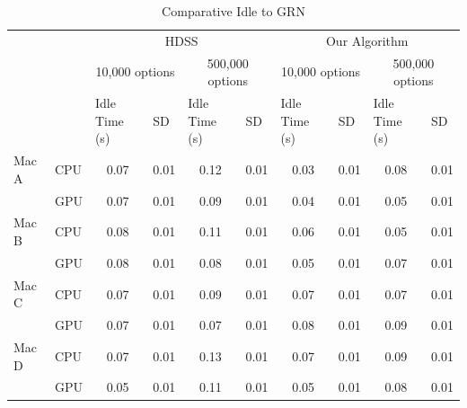 \documentclass[journal]{IEEEtran}
\begin{document}
\begin{table}[htb]
\centering
\caption{Comparative Idle to GRN}
\begin{scriptsize}
\begin{tabular}{|l|l|l|l|l|l|l|l|l|l|}
\cline{3-10}
\multicolumn{1}{l}{} &  & \multicolumn{4}{c|}{HDSS} & \multicolumn{4}{c|}{Our Algorithm} \\ 
\cline{3-10}
\multicolumn{1}{l}{} &  & \multicolumn{2}{c|}{10,000 options} & \multicolumn{2}{c|}{500,000 options} & \multicolumn{2}{c|}{10,000 options} & \multicolumn{2}{c|}{500,000 options} \\ 
\cline{3-10}
\multicolumn{1}{l}{} &  & Idle Time (s) & SD & Idle Time (s) & SD & Idle Time (s) & SD & Idle Time (s) & SD \\ 
\hline
Mac A & CPU & \multicolumn{1}{c|}{0.07} & \multicolumn{1}{c|}{0.01} & \multicolumn{1}{c|}{0.12} & \multicolumn{1}{c|}{0.01} & \multicolumn{1}{c|}{0.03} & \multicolumn{1}{c|}{0.01} & \multicolumn{1}{c|}{0.08} & \multicolumn{1}{c|}{0.01} \\ 
\cline{2-10}
 & GPU & \multicolumn{1}{c|}{0.07} & \multicolumn{1}{c|}{0.01} & \multicolumn{1}{c|}{0.09} & \multicolumn{1}{c|}{0.01} & \multicolumn{1}{c|}{0.04} & \multicolumn{1}{c|}{0.01} & \multicolumn{1}{c|}{0.05} & \multicolumn{1}{c|}{0.01} \\ 
\hline
Mac B & CPU & \multicolumn{1}{c|}{0.08} & \multicolumn{1}{c|}{0.01} & \multicolumn{1}{c|}{0.11} & \multicolumn{1}{c|}{0.01} & \multicolumn{1}{c|}{0.06} & \multicolumn{1}{c|}{0.01} & \multicolumn{1}{c|}{0.05} & \multicolumn{1}{c|}{0.01} \\ 
\cline{2-10}
 & GPU & \multicolumn{1}{c|}{0.08} & \multicolumn{1}{c|}{0.01} & \multicolumn{1}{c|}{0.08} & \multicolumn{1}{c|}{0.01} & \multicolumn{1}{c|}{0.05} & \multicolumn{1}{c|}{0.01} & \multicolumn{1}{c|}{0.07} & \multicolumn{1}{c|}{0.01} \\ 
\hline
Mac C & CPU & \multicolumn{1}{c|}{0.07} & \multicolumn{1}{c|}{0.01} & \multicolumn{1}{c|}{0.09} & \multicolumn{1}{c|}{0.01} & \multicolumn{1}{c|}{0.07} & \multicolumn{1}{c|}{0.01} & \multicolumn{1}{c|}{0.07} & \multicolumn{1}{c|}{0.01} \\ 
\cline{2-10}
 & GPU & \multicolumn{1}{c|}{0.07} & \multicolumn{1}{c|}{0.01} & \multicolumn{1}{c|}{0.07} & \multicolumn{1}{c|}{0.01} & \multicolumn{1}{c|}{0.08} & \multicolumn{1}{c|}{0.01} & \multicolumn{1}{c|}{0.09} & \multicolumn{1}{c|}{0.01} \\ 
\hline
Mac D & CPU & \multicolumn{1}{c|}{0.07} & \multicolumn{1}{c|}{0.01} & \multicolumn{1}{c|}{0.13} & \multicolumn{1}{c|}{0.01} & \multicolumn{1}{c|}{0.07} & \multicolumn{1}{c|}{0.01} & \multicolumn{1}{c|}{0.09} & \multicolumn{1}{c|}{0.01} \\ 
\cline{2-10}
 & GPU & \multicolumn{1}{c|}{0.05} & \multicolumn{1}{c|}{0.01} & \multicolumn{1}{c|}{0.11} & \multicolumn{1}{c|}{0.01} & \multicolumn{1}{c|}{0.05} & \multicolumn{1}{c|}{0.01} & \multicolumn{1}{c|}{0.08} & \multicolumn{1}{c|}{0.01} \\ 
\hline
\end{tabular}
\end{scriptsize}
\label{table: ociosidadeBlack}
\end{table}
\end{document}
